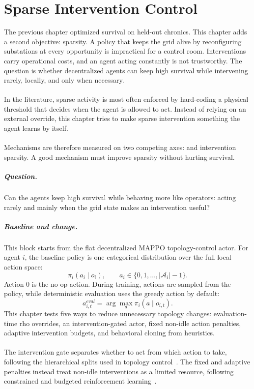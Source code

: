 \chapter{Sparse Intervention Control}
\label{ch:sparse-control}

The previous chapter optimized survival on held-out chronics. This chapter adds
a second objective: sparsity. A policy that keeps the grid alive by
reconfiguring substations at every opportunity is impractical for a control
room. Interventions carry operational costs, and an agent acting constantly is
not trustworthy. The question is whether decentralized
agents can keep high survival while intervening rarely, locally, and only when
necessary.
\\
\\
In the literature, sparse activity is most often enforced by hard-coding a
physical threshold that decides when the agent is allowed to act. Instead of
relying on an external override, this chapter tries to make sparse intervention
something the agent learns by itself.
\\
\\
Mechanisms are therefore measured on two competing axes:  and
intervention sparsity. A good mechanism must improve sparsity without hurting
survival.


\paragraph{Question.}
Can the agents keep high survival while behaving more like operators: acting
rarely and mainly when the grid state makes an intervention
useful?

\paragraph{Baseline and change.}
This block starts from the flat decentralized MAPPO topology-control actor. For
agent \(i\), the baseline policy is one categorical distribution over the full
local action space:
\[
  \pi_i(a_i \mid o_i),
  \qquad
  a_i \in \{0,1,\ldots,|\mathcal A_i|-1\}.
\]
Action \(0\) is the no-op action. During training, actions are sampled from the
policy, while deterministic evaluation uses the greedy action by default:
\[
  a_{i,t}^{eval}=\arg\max_a \pi_i(a\mid o_{i,t}).
\]
This chapter tests five ways to reduce unnecessary topology
changes: evaluation-time rho overrides, an intervention-gated actor, fixed
non-idle action penalties, adaptive intervention budgets, and behavioral cloning from heuristics.
\\
\\
The intervention gate separates whether to act from which action to take,
following the hierarchical splits used in topology control~\cite{manczak2023hrl,
vandersar2023hmarl}. The fixed and adaptive penalties instead treat non-idle
interventions as a limited resource, following constrained and budgeted
reinforcement learning~\cite{achiam2017cpo,stooke2020pid,carrara2019budgeted}.

